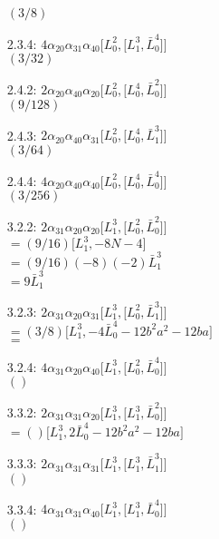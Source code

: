 \documentclass{article}
\newcommand{\lrbrack}[2]{\lbrack #1 , #2 \rbrack}
\begin{document}
\begin{itemize}
$(3/8)$\\
\item[2.3.4:] $4\alpha_{20}\alpha_{31}\alpha_{40} \lrbrack{L_0^2}{\lrbrack{L_1^3}{\bar{L}_0^4}}$\\
$(3/32)$\\
\item[2.4.2:] $2\alpha_{20}\alpha_{40}\alpha_{20} \lrbrack{L_0^2}{\lrbrack{L_0^4}{\bar{L}_0^2}}$\\
$(9/128)$\\
\item[2.4.3:] $2\alpha_{20}\alpha_{40}\alpha_{31} \lrbrack{L_0^2}{\lrbrack{L_0^4}{\bar{L}_1^3}}$\\
$(3/64)$\\
\item[2.4.4:] $4\alpha_{20}\alpha_{40}\alpha_{40} \lrbrack{L_0^2}{\lrbrack{L_0^4}{\bar{L}_0^4}}$\\
$(3/256)$\\
\item[3.2.2:] $2\alpha_{31}\alpha_{20}\alpha_{20} \lrbrack{L_1^3}{\lrbrack{L_0^2}{\bar{L}_0^2}}$\\
$ = (9/16) \lrbrack{L_1^3}{-8N-4}$\\
$ = (9/16) (-8)(-2)\bar{L}_1^3$\\
$ = 9 \bar{L}_1^3 $\\
\item[3.2.3:] $2\alpha_{31}\alpha_{20}\alpha_{31} \lrbrack{L_1^3}{\lrbrack{L_0^2}{\bar{L}_1^3}}$\\
$ = (3/8)\lrbrack{L_1^3}{-4\bar{L}_0^4-12b^2a^2 -12 ba}$\\
$=$ \\
\item[3.2.4:] $4\alpha_{31}\alpha_{20}\alpha_{40} \lrbrack{L_1^3}{\lrbrack{L_0^2}{\bar{L}_0^4}}$\\
$()$\\
\item[3.3.2:] $2\alpha_{31}\alpha_{31}\alpha_{20} \lrbrack{L_1^3}{\lrbrack{L_1^3}{\bar{L}_0^2}}$\\
$ = () \lrbrack{L_1^3}{2\bar{L}_0^4-12b^2a^2 -12 ba}$\\
\item[3.3.3:] $2\alpha_{31}\alpha_{31}\alpha_{31} \lrbrack{L_1^3}{\lrbrack{L_1^3}{\bar{L}_1^3}}$\\
$()$\\
\item[3.3.4:] $4\alpha_{31}\alpha_{31}\alpha_{40} \lrbrack{L_1^3}{\lrbrack{L_1^3}{\bar{L}_0^4}}$\\
$()$\\

\end{itemize}
\end{document}
